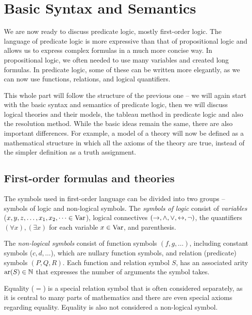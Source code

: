 
\chapter{Basic Syntax and Semantics}

We are now ready to discuss predicate logic, mostly first-order logic. The language of predicate logic is more expressive than that of propositional logic and allows us to express complex formulas in a much more concise way. In propositional logic, we often needed to use many variables and created long formulas. In predicate logic, some of these can be written more elegantly, as we can now use functions, relations, and logical quantifiers.

This whole part will follow the structure of the previous one -- we will again start with the basic syntax and semantics of predicate logic, then we will discuss logical theories and their models, the tableau method in predicate logic and also the resolution method. While the basic ideas remain the same, there are also important differences. For example, a model of a theory will now be defined as a mathematical structure in which all the axioms of the theory are true, instead of the simpler definition as a truth assignment.

\section{First-order formulas and theories}

The symbols used in first-order language can be divided into two groups -- symbols of logic and non-logical symbols. The \emph{symbols of logic} consist of \emph{variables} ($x, y, z, \dots, x_1, x_2, \dots \in \operatorname{Var}$), logical connectives $(\to, \land, \lor, \leftrightarrow, \neg)$, the quantifiers $(\forall x), (\exists x)$ for each variable $x \in \operatorname{Var}$, and parenthesis. 

The \emph{non-logical symbols} consist of function symbols $(f, g, \dots)$, including constant symbols ($c, d, \dots$), which are nullary function symbols, and relation (predicate) symbols $(P, Q, R)$. Each function and relation symbol $S$, has an associated arity $\operatorname{ar}(S)\in\mathbb{N}$ that expresses the number of arguments the symbol takes. 

Equality ($=$) is a special relation symbol that is often considered separately, as it is central to many parts of mathematics and there are even special axioms regarding equality. Equality is also not considered a non-logical symbol.

